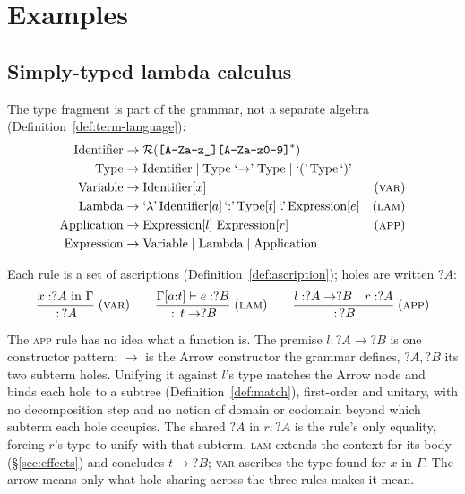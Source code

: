 \section{Examples}
\label{sec:examples}

\subsection{Simply-typed lambda calculus}

The type fragment is part of the grammar, not a separate algebra
(Definition~\ref{def:term-language}):
\[
  \begin{aligned}
    \text{Identifier} & \to \mathcal{R}(\texttt{[A-Za-z\_][A-Za-z0-9]}^\ast)                                                \\
    \text{Type}       & \to \text{Identifier} \mid \text{Type}\;\text{`$\to$'}\;\text{Type} \mid \text{`('}\,\text{Type}\,\text{`)'} \\
    \text{Variable}   & \to \text{Identifier}[x]                                                            & (\textsc{var}) \\
    \text{Lambda}     & \to \text{`$\lambda$'}\,\text{Identifier}[a]\,\text{`:'}\,\text{Type}[t]\,\text{`.'}\,\text{Expression}[e] & (\textsc{lam}) \\
    \text{Application}& \to \text{Expression}[l]\;\text{Expression}[r]                                      & (\textsc{app}) \\
    \text{Expression} & \to \text{Variable} \mid \text{Lambda} \mid \text{Application}
  \end{aligned}
\]

Each rule is a set of ascriptions (Definition~\ref{def:ascription}); holes are
written $?A$:
\[
  \frac{x : ?A \ \text{in}\ \Gamma}{\,:\,?A}\;(\textsc{var})
  \qquad
  \frac{\Gamma[a{:}t] \vdash e : ?B}{\,:\,t \to ?B}\;(\textsc{lam})
  \qquad
  \frac{l : ?A \to ?B \quad r : ?A}{\,:\,?B}\;(\textsc{app})
\]

The \textsc{app} rule has no idea what a function is. The premise $l : ?A \to ?B$
is one constructor pattern: $\to$ is the Arrow constructor the grammar defines,
$?A, ?B$ its two subterm holes. Unifying it against $l$'s type matches the Arrow
node and binds each hole to a subtree (Definition~\ref{def:match}), first-order
and unitary, with no decomposition step and no notion of domain or codomain
beyond which subterm each hole occupies. The shared $?A$ in $r : ?A$ is the
rule's only equality, forcing $r$'s type to unify with that subterm.
\textsc{lam} extends the context for its body (\S\ref{sec:effects}) and concludes
$t \to ?B$; \textsc{var} ascribes the type found for $x$ in $\Gamma$. The arrow
means only what hole-sharing across the three rules makes it mean.

